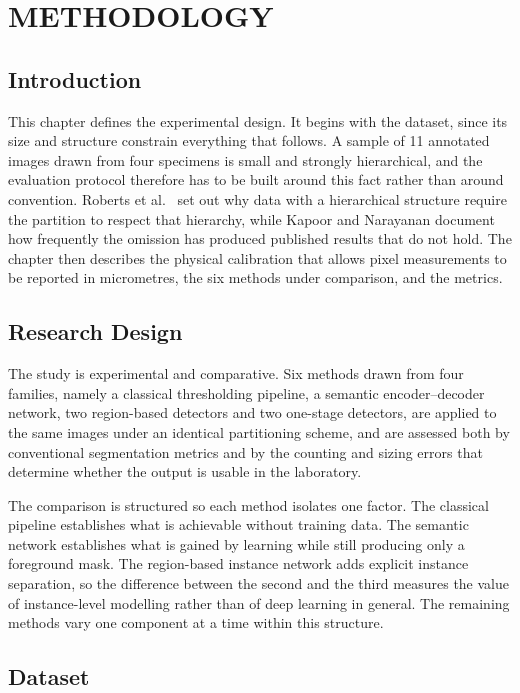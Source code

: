 \chapter{METHODOLOGY}
\label{ch:methodology}

\section{Introduction}

This chapter defines the experimental design. It begins with the dataset, since its
size and structure constrain everything that follows. A sample of 11 annotated
images drawn from four specimens is small and strongly hierarchical, and the
evaluation protocol therefore has to be built around this fact rather than around
convention. Roberts et al.\ \cite{roberts2017crossvalidation} set out why data with
a hierarchical structure require the partition to respect that hierarchy, while
Kapoor and Narayanan \cite{kapoor2023leakage} document how frequently the omission
has produced published results that do not hold.
The chapter then describes the physical calibration that allows pixel measurements
to be reported in micrometres, the six methods under comparison, and the metrics.

\section{Research Design}

The study is experimental and comparative. Six methods drawn from four families,
namely a classical thresholding pipeline, a semantic encoder--decoder network, two
region-based detectors and two one-stage detectors, are applied to the same
images under an identical partitioning scheme, and are assessed both by
conventional segmentation metrics and by the counting and sizing errors that
determine whether the output is usable in the laboratory.

The comparison is structured so each method isolates one factor. The
classical pipeline establishes what is achievable without training data. The
semantic network establishes what is gained by learning while still producing only
a foreground mask. The region-based instance network adds explicit instance
separation, so the difference between the second and the third measures the value
of instance-level modelling rather than of deep learning in general. The remaining
methods vary one component at a time within this structure.

\section{Dataset}


